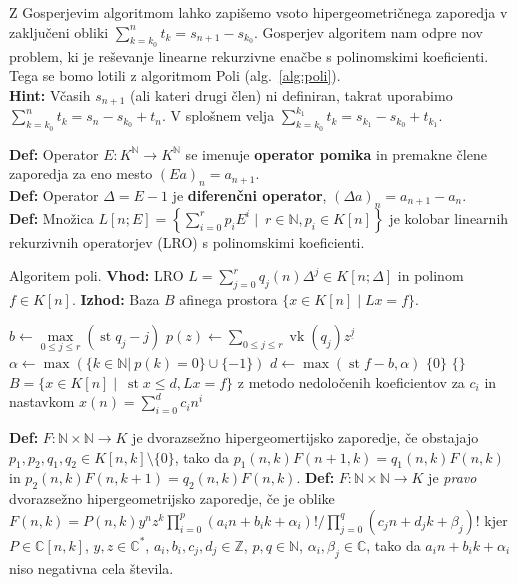 \documentclass[a4paper,oneside,10pt]{article}
\theoremstyle{definition}
\newcommand{\N}{\ensuremath{\mathbb{N}}}
\newcommand{\Z}{\ensuremath{\mathbb{Z}}}
\renewcommand{\C}{\ensuremath{\mathbb{C}}}
\newcommand{\lap}{\Delta}
\newcommand{\st}{\operatorname{st}}
\newcommand{\vk}{\operatorname{vk}}
\let\oldtextbf\textbf
\renewcommand{\textbf}[1]{\oldtextbf{\boldmath #1}}
\begin{document}
Z Gosperjevim algoritmom lahko zapišemo vsoto hipergeometričnega zaporedja v zaključeni obliki $\sum_{k=k_0}^{n} t_k = s_{n+1} - s_{k_0}$. Gosperjev algoritem nam odpre nov problem, ki je reševanje linearne rekurzivne enačbe s polinomskimi koeficienti. Tega se bomo lotili z algoritmom Poli (alg.~\ref{alg:poli}). \\
\textbf{Hint:} Včasih $s_{n+1}$ (ali kateri drugi člen) ni definiran, takrat uporabimo $\sum_{k=k_0}^{n} t_k = s_{n} - s_{k_0} + t_n$. V splošnem velja $\sum_{k=k_0}^{k_1} t_k = s_{k_1} - s_{k_0} + t_{k_1}$.

\textbf{Def:} Operator $E \colon K^\N \rightarrow K^\N$ se imenuje \textbf{operator pomika} in premakne člene zaporedja za eno mesto $(Ea)_n = a_{n+1}$. \\
\textbf{Def:} Operator $\lap = E-1$ je \textbf{diferenčni operator}, $(\lap a)_n = a_{n+1} - a_n$.\\
\textbf{Def:} Množica $L[n; E] = \left\{\sum\limits_{i=0}^{r} p_i E^i \mid \ r \in \N, p_i \in K[n] \right\}$ je kolobar linearnih rekurzivnih operatorjev (LRO) s polinomskimi koeficienti.

\begin{algorithm}[!ht]
\caption{Algoritem poli. \newline
\textbf{Vhod:} LRO $L = \sum_{j=0}^{r}q_j(n) \lap^j \in K[n;\lap]$ in polinom $f \in K[n]$. \newline
\textbf{Izhod:} Baza $B$ afinega prostora $\{x \in K[n] \mid Lx = f \}$.}
\label{alg:poli}
\begin{algorithmic}[1]
    \State $b \gets \max\limits_{0 \leq j \leq r}(\st q_j - j)$
    \State $p(z) \gets \sum\limits_{0 \leq j \leq r}\vk(q_j) z^{\underline{j}}$
    \State $\alpha \gets \max(\{k \in \N\rvert\ p(k) = 0\} \cup \{-1\})$
    \State $d \gets \max(\st f - b, \alpha)$
            \State \Return $\{0\}$
        \Else
            \State \Return $\{\}$
        \EndIf
    \Else
        \State \Return $B = \{x \in K[n] \mid \ \st x \leq d, Lx = f\}$
        \Comment z metodo nedoločenih koeficientov
    \EndIf
    \Comment za $c_i$ in nastavkom $x(n) = \sum_{i=0}^d c_i n^i$
\EndProcedure
\end{algorithmic}
\end{algorithm}

\textbf{Def:} $F\colon \N\times\N \to K$ je dvorazsežno hipergeomertijsko zaporedje, če obstajajo $p_1, p_2, q_1, q_2 \in K[n, k] \setminus \{0\}$, tako da $p_1(n, k)F(n+1, k) = q_1(n, k)F(n, k)$ in $p_2(n, k)F(n, k+1) = q_2(n, k)F(n, k)$.
\textbf{Def:} $F\colon \N\times\N \to K$ je \emph{pravo} dvorazsežno hipergeometrijsko zaporedje, če je oblike $F(n,k) = P(n,k)y^nz^k\prod_{i=0}^p(a_i n+b_i k+\alpha_i)! /  \prod_{j=0}^q(c_j n+d_j k+\beta_j)!$ kjer $P\in \C[n,k]$, $y,z\in\C^*$, $a_i,b_i,c_j,d_j\in\Z$, $p,q\in\N$, $\alpha_i,\beta_j\in\C$, tako da $a_i n +b_i k+\alpha_i$ niso negativna cela števila.
\end{document}
